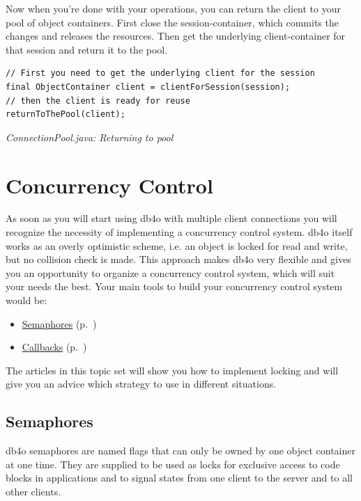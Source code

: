 Now when you're done with your operations, you can return the client to your pool of object containers. First close the session-container, which commits the changes and releases the resources. Then get the underlying client-container for that session and return it to the pool.

\begin{lstlisting}
// First you need to get the underlying client for the session
final ObjectContainer client = clientForSession(session);
// then the client is ready for reuse
returnToThePool(client);
\end{lstlisting}

{\small\itshape ConnectionPool.java: Returning to pool\par}
\medskip

\section{Concurrency Control}
\label{ref:client-server-concurrency-control}

As soon as you will start using db4o with multiple client connections you will recognize the necessity of implementing a concurrency control system. db4o itself works as an overly optimistic scheme, i.e. an object is locked for read and write, but no collision check is made. This approach makes db4o very flexible and gives you an opportunity to organize a concurrency control system, which will suit your needs the best. Your main tools to build your concurrency control system would be:

\begin{itemize}
\item \hyperref[ref:client-server-semaphores]{Semaphores} (p.~\pageref{ref:client-server-semaphores})
\item \hyperref[ref:advanced-topics-callbacks]{Callbacks} (p.~\pageref{ref:advanced-topics-callbacks})
\end{itemize}

The articles in this topic set will show you how to implement locking and will give you an advice which strategy to use in different situations.

\subsection{Semaphores}
\label{ref:client-server-semaphores}

db4o semaphores are named flags that can only be owned by one object container at one time. They are supplied to be used as locks for exclusive access to code blocks in applications and to signal states from one client to the server and to all other clients.

